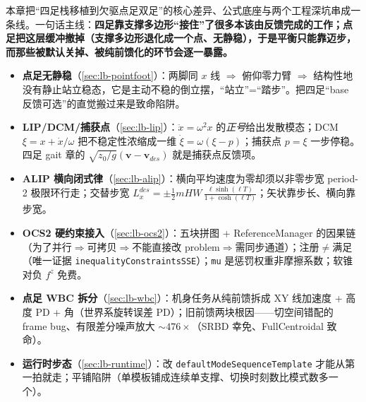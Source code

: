 本章把“四足栈移植到欠驱点足双足”的核心差异、公式底座与两个工程深坑串成一条线。一句话主线：\textbf{四足靠支撑多边形“接住”了很多本该由反馈完成的工作；点足把这层缓冲撤掉（支撑多边形退化成一个点、无静稳），于是平衡只能靠迈步，而那些被默认关掉、被纯前馈化的环节会逐一暴露。}

\begin{itemize}
  \item \textbf{点足无静稳}（\cref{sec:lb-pointfoot}）：两脚同 $x$ 线 $\Rightarrow$ 俯仰零力臂 $\Rightarrow$ 结构性地没有静止站立稳态，它是主动不稳的倒立摆，“站立”=“踏步”。把四足“base 反馈可选”的直觉搬过来是致命陷阱。
  \item \textbf{LIP/DCM/捕获点}（\cref{sec:lb-lip}）：$\ddot x=\omega^2 x$ 的\emph{正号}给出发散模态；DCM $\xi=x+\dot x/\omega$ 把不稳定性浓缩成一维 $\dot\xi=\omega(\xi-p)$；捕获点 $p=\xi$ 一步停稳。四足 gait 章的 $\sqrt{z_0/g}(\mathbf v-\mathbf v_{des})$ 就是捕获点反馈项。
  \item \textbf{ALIP 横向闭式律}（\cref{sec:lb-alip}）：横向平均速度为零却须以非零步宽 period-2 极限环行走；交替步宽 $L_x^{des}=\pm\frac12 mHW\,\frac{\ell\sinh(\ell T)}{1+\cosh(\ell T)}$；矢状靠步长、横向靠步宽。
  \item \textbf{OCS2 硬约束接入}（\cref{sec:lb-ocs2}）：五块拼图 + ReferenceManager 的因果链（为了并行$\Rightarrow$可拷贝$\Rightarrow$不能直接改 problem$\Rightarrow$需同步通道）；注册$\ne$满足（唯一证据 \texttt{inequalityConstraintsSSE}）；\texttt{mu} 是惩罚权重非摩擦系数；软锥对负 $f^z$ 免费。
  \item \textbf{点足 WBC 拆分}（\cref{sec:lb-wbc}）：机身任务从纯前馈拆成 XY 线加速度 + 高度 PD + 角（世界系旋转误差 PD）；旧前馈两块根因——切空间错配的 frame bug、有限差分噪声放大 $\sim 476\times$（SRBD 幸免、FullCentroidal 致命）。
  \item \textbf{运行时步态}（\cref{sec:lb-runtime}）：改 \texttt{defaultModeSequenceTemplate} 才能从第一拍就走；平铺陷阱（单模板铺成连续单支撑、切换时刻数比模式数多一个）。
\end{itemize}

